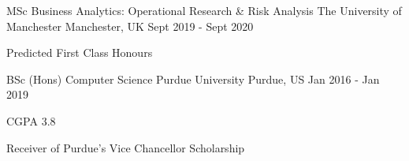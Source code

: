 

\begin{cventries}

  \cventry
    {MSc Business Analytics: Operational Research \& Risk Analysis} %
    {The University of Manchester} %
    {Manchester, UK} %
    {Sept 2019 - Sept 2020} %
    {
      \begin{cvitems} %
        \item{Predicted First Class Honours}
      \end{cvitems}
    }

  \cventry
    {BSc (Hons) Computer Science} %
    {Purdue University} %
    {Purdue, US} %
    {Jan 2016 - Jan 2019} %
    {
      \begin{cvitems} %
        \item {CGPA 3.8}
        \item {Receiver of Purdue's Vice Chancellor Scholarship}
      \end{cvitems}
    }  

\end{cventries}
